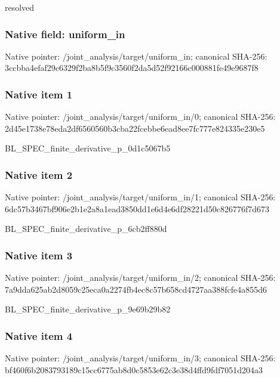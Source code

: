 \documentclass[10pt,a4paper]{article}
\begin{document}
\begingroup\raggedright\sloppy resolved\par\endgroup

\subsubsection{Native field: uniform\_\allowbreak{}in}
Native pointer: /joint\_\allowbreak{}analysis/target/uniform\_\allowbreak{}in; canonical SHA-256: 3ccbba4efaf29c6329f2ba8b5f9c3560f2da5d52f92166c000881fe49e9687f8

\subsubsection{Native item 1}
Native pointer: /joint\_\allowbreak{}analysis/target/uniform\_\allowbreak{}in/0; canonical SHA-256: 2d45e1738e78eda2df6560560b3cba22fcebbe6ead8ee7fc777e824335e230e5

\begingroup\raggedright\sloppy BL\_\allowbreak{}SPEC\_\allowbreak{}finite\_\allowbreak{}derivative\_\allowbreak{}p\_\allowbreak{}0d1c5067b5\par\endgroup

\subsubsection{Native item 2}
Native pointer: /joint\_\allowbreak{}analysis/target/uniform\_\allowbreak{}in/1; canonical SHA-256: 6dc57b3467bf906e2b1e2a8a1ead3850dd1e6d4e6df28221d50c826776f7d673

\begingroup\raggedright\sloppy BL\_\allowbreak{}SPEC\_\allowbreak{}finite\_\allowbreak{}derivative\_\allowbreak{}p\_\allowbreak{}6cb2ff880d\par\endgroup

\subsubsection{Native item 3}
Native pointer: /joint\_\allowbreak{}analysis/target/uniform\_\allowbreak{}in/2; canonical SHA-256: 7a9dda625ab2d8059c25eca0a2274fb4ec8c57b658cd4727aa388fcfe4a855d6

\begingroup\raggedright\sloppy BL\_\allowbreak{}SPEC\_\allowbreak{}finite\_\allowbreak{}derivative\_\allowbreak{}p\_\allowbreak{}9e69b29b82\par\endgroup

\subsubsection{Native item 4}
Native pointer: /joint\_\allowbreak{}analysis/target/uniform\_\allowbreak{}in/3; canonical SHA-256: bf460f6b2083793189c15cc6775ab8d0c5853e62c3e38d4ffd9fdf7051d204a3
\end{document}
